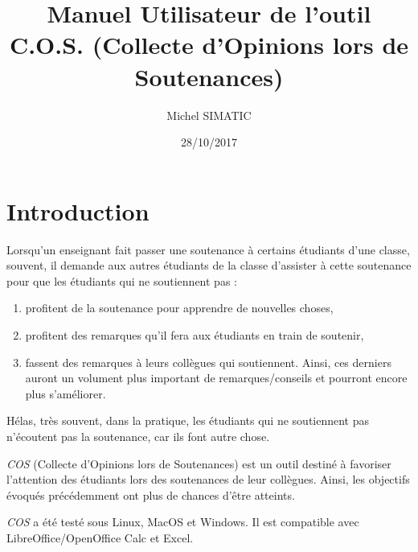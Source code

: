 \documentclass[11pt]{article}
\author{Michel SIMATIC}
\date{28/10/2017}
\title{Manuel Utilisateur de l'outil C.O.S. (Collecte d'Opinions lors de Soutenances)}
\begin{document}
\maketitle
\tableofcontents


\section{Introduction}
\label{sec-1}
Lorsqu'un enseignant fait passer une soutenance à certains étudiants
d'une classe, souvent, il demande aux autres étudiants de la classe
d'assister à cette soutenance pour que les étudiants qui ne
soutiennent pas :
\begin{enumerate}
\item profitent de la soutenance pour apprendre de nouvelles choses,
\item profitent des remarques qu'il fera aux étudiants en train de
soutenir,
\item fassent des remarques à leurs collègues qui soutiennent. Ainsi, ces
derniers auront un volument plus important de remarques/conseils et
pourront encore plus s'améliorer.
\end{enumerate}
Hélas, très souvent, dans la pratique, les étudiants qui ne soutiennent
pas n'écoutent pas la soutenance, car ils font autre chose.

\emph{COS} (Collecte d'Opinions lors de Soutenances) est un outil destiné
à favoriser l'attention des étudiants lors des soutenances de leur
collègues. Ainsi, les objectifs évoqués précédemment ont plus de
chances d'être atteints.

\emph{COS} a été testé sous Linux, MacOS et Windows. Il est compatible avec
LibreOffice/OpenOffice Calc et Excel.
\end{document}
